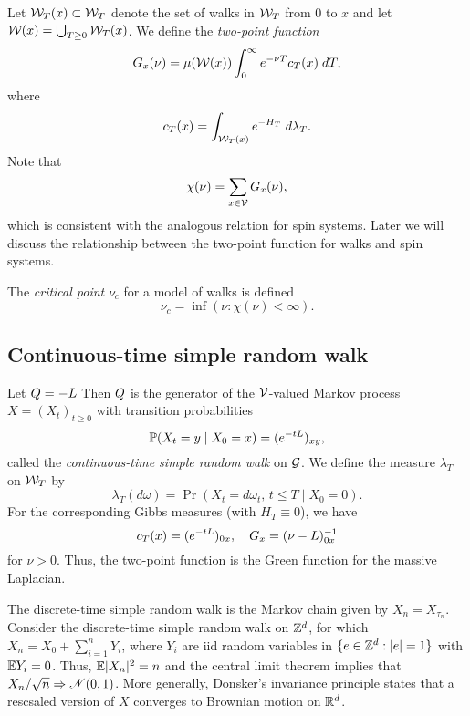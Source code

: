 Let $\mathcal{W}_T(x) \subset \mathcal{W}_T$ denote the set of walks in $\mathcal{W}_T$ from $0$ to $x$ and let $\mathcal{W}(x) = \bigcup_{T \ge 0} \mathcal{W}_T(x)$. We define the
\emph{two-point function}
\begin{equation}
G_x(\nu) = \mu(\mathcal{W}(x)) \int_0^\infty e^{-\nu T} c_T(x) \; dT,
\end{equation}
where
\begin{equation}
c_T(x) = \int_{\mathcal{W}_T(x)} e^{-H_T} \; d\lambda_T.
\end{equation}
Note that
\begin{equation}
\chi(\nu) = \sum_{x\in\mathcal{V}} G_x(\nu),
\end{equation}
which is consistent with the analogous relation for spin systems. Later we will discuss the relationship between the two-point function for walks and spin systems.

The \emph{critical point} $\nu_c$ for a model of walks is defined
\begin{equation}
\nu_c = \inf (\nu : \chi(\nu) < \infty).
\end{equation}


\subsection{Continuous-time simple random walk}

Let $Q = -L$
Then $Q$ is the generator of the $\mathcal{V}$-valued Markov process
$X = (X_t)_{t \ge 0}$ with transition probabilities
\begin{equation}
\operatorname{\mathbb{P}}(X_t = y \mid X_0 = x) = (e^{-t L})_{xy},
\end{equation}
called the \emph{continuous-time simple random walk} on $\mathcal{G}$.
We define the measure $\lambda_T$ on $\mathcal{W}_T$ by
\begin{equation}
\lambda_T(d\omega) = \Pr(X_t = d\omega_t, \, t \le T \mid X_0 = 0).
\end{equation}
For the corresponding Gibbs measures (with $H_T \equiv 0$), we have
\begin{equation}
c_T(x) = (e^{-t L})_{0x},
  \quad
G_x = (\nu - L)^{-1}_{0x}
\end{equation}
for $\nu > 0$. Thus, the two-point function is the Green function for the
massive Laplacian.

\begin{example}
The discrete-time simple random walk is the Markov chain given by
$X_n = X_{\tau_n}$. Consider the discrete-time simple random walk on ${ {{\mathbb Z}}^d }$,
for which $X_n = X_0 + \sum_{i=1}^n Y_i$, where $Y_i$ are iid random variables
in $\{ e \in { {{\mathbb Z}}^d } : |e| = 1 \}$ with $\mathbb{E} Y_i = 0$. Thus, $\mathbb{E} |X_n|^2 = n$ and
the central limit theorem implies that
$X_n / \sqrt n \Rightarrow \mathscr{N}(0, 1)$. More generally, Donsker's invariance
principle states that a rescsaled version of $X$ converges to Brownian motion on ${ {{\mathbb R}}^d}$.
\end{example}

